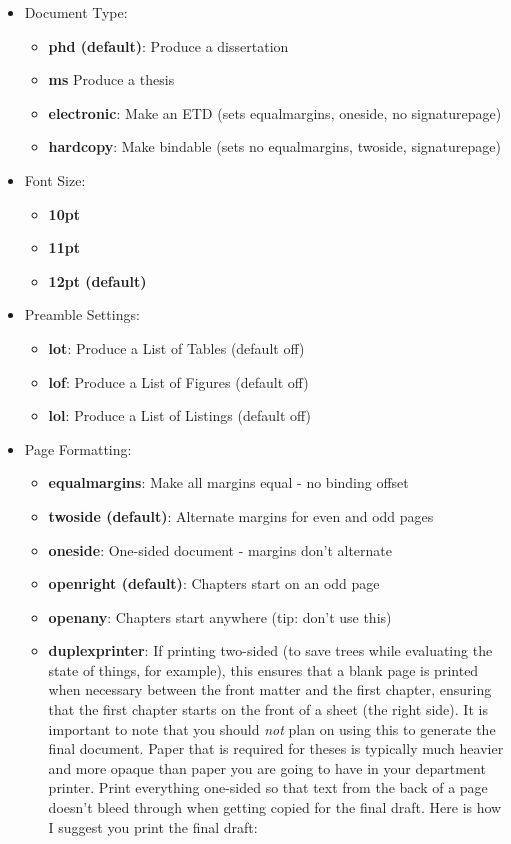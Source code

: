 \documentclass[phd,electronic,letterpaper,chaptercenter,parttop]{byumsphd}
\begin{document}
\begin{itemize}
    \item Document Type:
        \begin{itemize}
            \item \textbf{phd (default)}: Produce a dissertation
            \item \textbf{ms} Produce a thesis 
            \item \textbf{electronic}: Make an ETD (sets equalmargins, oneside, no signaturepage)
            \item \textbf{hardcopy}: Make bindable (sets no equalmargins, twoside, signaturepage)
        \end{itemize}
\pagebreak
    \item Font Size:
        \begin{itemize}
            \item \textbf{10pt}
            \item \textbf{11pt}
            \item \textbf{12pt (default)}
        \end{itemize}
    \item Preamble Settings:
        \begin{itemize}
            \item \textbf{lot}: Produce a List of Tables (default off)
            \item \textbf{lof}: Produce a List of Figures (default off)
            \item \textbf{lol}: Produce a List of Listings (default off)
        \end{itemize}
    \item Page Formatting:
        \begin{itemize}
            \item \textbf{equalmargins}: Make all margins equal - no binding offset
            \item \textbf{twoside (default)}: Alternate margins for even and odd pages
            \item \textbf{oneside}: One-sided document - margins don't alternate
            \item \textbf{openright (default)}: Chapters start on an odd page
            \item \textbf{openany}: Chapters start anywhere (tip: don't use this)
            \item \textbf{duplexprinter}: If printing two-sided (to save trees while evaluating the state of things, for example), this ensures that a blank page is printed when necessary between the front matter and the first chapter, ensuring that the first chapter starts on the front of a sheet (the right side).  It is important to note that you should \emph{not} plan on using this to generate the final document.  Paper that is required for theses is typically much heavier and more opaque than paper you are going to have in your department printer.  Print everything one-sided so that text from the back of a page doesn't bleed through when getting copied for the final draft.  Here is how I suggest you print the final draft:

\end{itemize}
\end{itemize}
\end{document}
